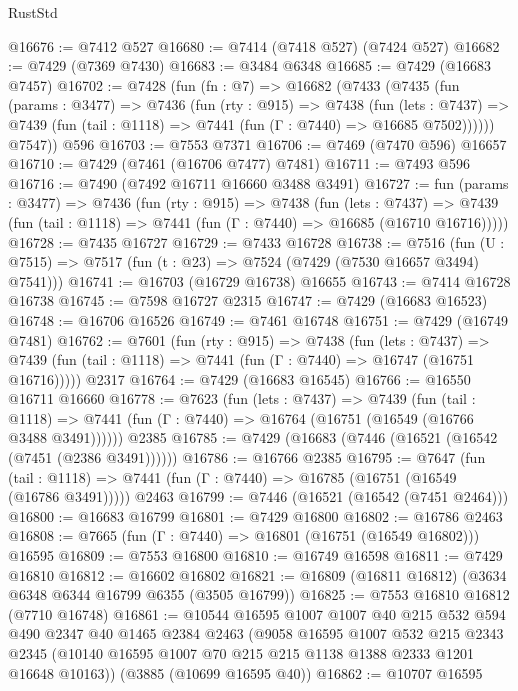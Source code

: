 \begin{lexlean}{RustStd}
\begin{coremodule}
@16676 := @7412 @527
@16680 := @7414 (@7418 @527) (@7424 @527)
@16682 := @7429 (@7369 @7430)
@16683 := @3484 @6348
@16685 := @7429 (@16683 @7457)
@16702 := @7428
    (fun (fn : @7) =>
    @16682
      (@7433
        (@7435
          (fun (params : @3477) =>
          @7436
            (fun (rty : @915) =>
            @7438
              (fun (lets : @7437) =>
              @7439 (fun (tail : @1118) => @7441 (fun (Γ : @7440) => @16685 @7502))))))
        @7547))
    @596
@16703 := @7553 @7371
@16706 := @7469 (@7470 @596) @16657
@16710 := @7429 (@7461 (@16706 @7477) @7481)
@16711 := @7493 @596
@16716 := @7490 (@7492 @16711 @16660 @3488 @3491)
@16727 := fun (params : @3477) =>
  @7436
    (fun (rty : @915) =>
    @7438
      (fun (lets : @7437) =>
      @7439 (fun (tail : @1118) => @7441 (fun (Γ : @7440) => @16685 (@16710 @16716)))))
@16728 := @7435 @16727
@16729 := @7433 @16728
@16738 := @7516
    (fun (U : @7515) => @7517 (fun (t : @23) => @7524 (@7429 (@7530 @16657 @3494) @7541)))
@16741 := @16703 (@16729 @16738) @16655
@16743 := @7414 @16728 @16738
@16745 := @7598 @16727 @2315
@16747 := @7429 (@16683 @16523)
@16748 := @16706 @16526
@16749 := @7461 @16748
@16751 := @7429 (@16749 @7481)
@16762 := @7601
    (fun (rty : @915) =>
    @7438
      (fun (lets : @7437) =>
      @7439 (fun (tail : @1118) => @7441 (fun (Γ : @7440) => @16747 (@16751 @16716)))))
    @2317
@16764 := @7429 (@16683 @16545)
@16766 := @16550 @16711 @16660
@16778 := @7623
    (fun (lets : @7437) =>
    @7439
      (fun (tail : @1118) =>
      @7441 (fun (Γ : @7440) => @16764 (@16751 (@16549 (@16766 @3488 @3491))))))
    @2385
@16785 := @7429 (@16683 (@7446 (@16521 (@16542 (@7451 (@2386 @3491))))))
@16786 := @16766 @2385
@16795 := @7647
    (fun (tail : @1118) => @7441 (fun (Γ : @7440) => @16785 (@16751 (@16549 (@16786 @3491)))))
    @2463
@16799 := @7446 (@16521 (@16542 (@7451 @2464)))
@16800 := @16683 @16799
@16801 := @7429 @16800
@16802 := @16786 @2463
@16808 := @7665 (fun (Γ : @7440) => @16801 (@16751 (@16549 @16802))) @16595
@16809 := @7553 @16800
@16810 := @16749 @16598
@16811 := @7429 @16810
@16812 := @16602 @16802
@16821 := @16809 (@16811 @16812) (@3634 @6348 @6344 @16799 @6355 (@3505 @16799))
@16825 := @7553 @16810 @16812 (@7710 @16748)
@16861 := @10544
    @16595
    @1007
    @1007
    @40
    @215
    @532
    @594
    @490
    @2347
    @40
    @1465
    @2384
    @2463
    (@9058
      @16595
      @1007
      @532
      @215
      @2343
      @2345
      (@10140 @16595 @1007 @70 @215 @215 @1138 @1388 @2333 @1201 @16648 @10163))
    (@3885 (@10699 @16595 @40))
@16862 := @10707 @16595

\end{coremodule}
\end{lexlean}
